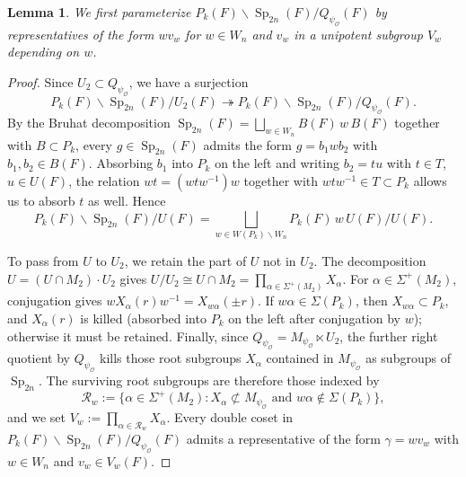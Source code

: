 \documentclass[11pt,notitlepage]{amsart}
\newtheorem{lemma}[theorem]{Lemma}
\theoremstyle{definition}
\theoremstyle{remark}
\newcommand{\calO}{\mathcal{O}}
\newcommand{\calR}{\mathcal{R}}
\DeclareMathOperator{\Sp}{Sp}
\begin{document}
\begin{lemma}
    We first parameterize $P_k(F) \backslash \Sp_{2n}(F) / Q_{\psi_\calO}(F)$ by representatives of the form $w v_w$ for $w \in W_n$ and $v_w$ in a unipotent subgroup $V_w$ depending on $w$. 
\end{lemma}
\begin{proof}
    Since $U_2 \subset Q_{\psi_\calO}$, we have a surjection
\[
    P_k(F) \backslash \Sp_{2n}(F) / U_2(F) \twoheadrightarrow P_k(F) \backslash \Sp_{2n}(F) / Q_{\psi_\calO}(F).
\] By the Bruhat decomposition $\Sp_{2n}(F) = \bigsqcup_{w \in W_n} B(F)\, w\, B(F)$ together with $B \subset P_k$, every $g \in \Sp_{2n}(F)$ admits the form $g = b_1 w b_2$ with $b_1, b_2 \in B(F)$. Absorbing $b_1$ into $P_k$ on the left and writing $b_2 = t u$ with $t \in T$, $u \in U(F)$, the relation $w t = (w t w^{-1}) w$ together with $w t w^{-1} \in T \subset P_k$ allows us to absorb $t$ as well. Hence
\[
    P_k(F) \backslash \Sp_{2n}(F) / U(F) = \bigsqcup_{w \in W(P_k) \backslash W_n} P_k(F)\, w\, U(F) / U(F).
\]

To pass from $U$ to $U_2$, we retain the part of $U$ not in $U_2$. The decomposition $U = (U \cap M_2) \cdot U_2$ gives
    $U / U_2 \cong U \cap M_2 = \prod_{\alpha \in \Sigma^+(M_2)} X_\alpha$. For $\alpha \in \Sigma^+(M_2)$, conjugation gives $w X_\alpha(r) w^{-1} = X_{w \alpha}(\pm r)$. If $w \alpha \in \Sigma(P_k)$, then $X_{w \alpha} \subset P_k$, and $X_\alpha(r)$ is killed (absorbed into $P_k$ on the left after conjugation by $w$); otherwise it must be retained. Finally, since $Q_{\psi_\calO} = M_{\psi_\calO} \ltimes U_2$, the further right quotient by $Q_{\psi_\calO}$ kills those root subgroups $X_\alpha$ contained in $M_{\psi_\calO}$ as subgroups of $\Sp_{2n}$. The surviving root subgroups are therefore those indexed by
\[
    \calR_w := \{\alpha \in \Sigma^+(M_2) : X_\alpha \not\subset M_{\psi_\calO} \text{ and } w \alpha \notin \Sigma(P_k)\},
\]
and we set $V_w := \prod_{\alpha \in \calR_w} X_\alpha$. Every double coset in $P_k(F) \backslash \Sp_{2n}(F) / Q_{\psi_\calO}(F)$ admits a representative of the form $\gamma = w v_w$ with $w \in W_n$ and $v_w \in V_w(F)$.
\end{proof}
\end{document}
